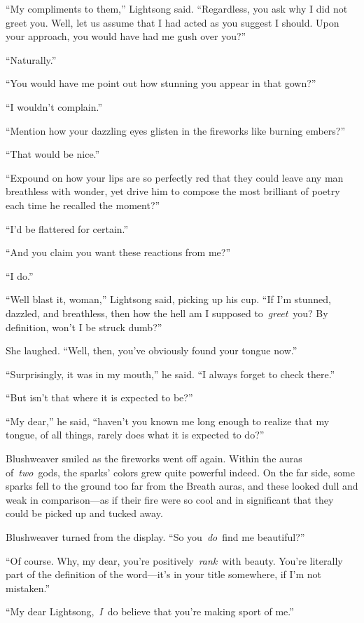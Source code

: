 “My compliments to them,” Lightsong said. “Regardless, you ask why I did not greet you. Well, let us assume that I had acted as you suggest I should. Upon your approach, you would have had me gush over you?”

“Naturally.”

“You would have me point out how stunning you appear in that gown?”

“I wouldn’t complain.”

“Mention how your dazzling eyes glisten in the fireworks like burning embers?”

“That would be nice.”

“Expound on how your lips are so perfectly red that they could leave any man breathless with wonder, yet drive him to compose the most brilliant of poetry each time he recalled the moment?”

“I’d be flattered for certain.”

“And you claim you want these reactions from me?”

“I do.”

“Well blast it, woman,” Lightsong said, picking up his cup. “If I’m stunned, dazzled, and breathless, then how the hell am I supposed to~\textit{greet}~you? By definition, won’t I be struck dumb?”

She laughed. “Well, then, you’ve obviously found your tongue now.”

“Surprisingly, it was in my mouth,” he said. “I always forget to check there.”

“But isn’t that where it is expected to be?”

“My dear,” he said, “haven’t you known me long enough to realize that my tongue, of all things, rarely does what it is expected to do?”

Blushweaver smiled as the fireworks went off again. Within the auras of~\textit{two}~gods, the sparks’ colors grew quite powerful indeed. On the far side, some sparks fell to the ground too far from the Breath auras, and these looked dull and weak in comparison—as if their fire were so cool and in significant that they could be picked up and tucked away.

Blushweaver turned from the display. “So you~\textit{do}~find me beautiful?”

“Of course. Why, my dear, you’re positively~\textit{rank}~with beauty. You’re literally part of the definition of the word—it’s in your title somewhere, if I’m not mistaken.”

“My dear Lightsong,~\textit{I}~do believe that you’re making sport of me.”

